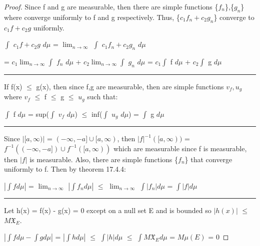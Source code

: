    \begin{proof}
        Since f and g are measurable, then there are simple functions
        \{$f_n$\},\{$g_n$\} where converge uniformly to f and g respectively.
        Thus, \{$c_1f_n+c_2g_n$\} converge to $c_1f+c_2g$ uniformly.

        \hspace{0.5cm}
        $\int$ $c_1f + c_2g$ $d\mu$
        = $\lim_{n \rightarrow \infty}$ $\int$ $c_1f_n + c_2g_n$ $d\mu$

        \hspace{3.3cm}
        = $c_1 \lim_{n \rightarrow \infty} \int$ $f_n$ $d\mu$
            + $c_2 \lim_{n \rightarrow \infty} \int$ $g_n$ $d\mu$
        = $c_1 \int$ f $d\mu$ + $c_2 \int$ g $d\mu$

        \rule[0.1cm]{15.2cm}{0.01cm}

        If f(x) $\leq$ g(x), then since f,g are measurable, then
        are simple functions $v_f,u_g$ where
        $v_f$ $\leq$ f $\leq$ g $\leq$ $u_g$ such that:

        \hspace{0.5cm}
        $\int$ f $d\mu$
        = sup($\int$ $v_f$ $d\mu$)
        $\leq$ inf($\int$ $u_g$ $d\mu$)
        = $\int$ g $d\mu$

        \rule[0.1cm]{15.2cm}{0.01cm}

        Since $|[a,\infty)|$ = $(-\infty,-a] \cup [a,\infty)$, then
        $|f|^{-1}([a,\infty))$ = $f^{-1}((-\infty,-a]) \cup f^{-1}([a,\infty))$
        which are measurable since f is measurable, then $|f|$ is measurable.
        Also, there are simple functions
        \{$f_n$\} that converge uniformly to f.
        Then by {\color{red} theorem 17.4.4}:

        \hspace{0.5cm}
        $|\int f d\mu|$
        = $\lim_{n \rightarrow \infty}$ $|\int f_n d\mu|$
        $\leq$ $\lim_{n \rightarrow \infty}$ $\int |f_n| d\mu$
        = $\int |f| d\mu$

        \rule[0.1cm]{15.2cm}{0.01cm}

        Let h(x) = f(x) - g(x) = 0 except on a null set E and is bounded
        so $|h(x)|$ $\leq$ $M \mathfrak{X}_E$.

        \hspace{0.5cm}
        $|\int f d\mu - \int g d\mu|$
        = $|\int h d\mu|$
        $\leq$ $\int |h| d\mu$
        $\leq$ $\int M \mathfrak{X}_E d\mu$
        = $M \mu(E)$ = 0
    \end{proof}

